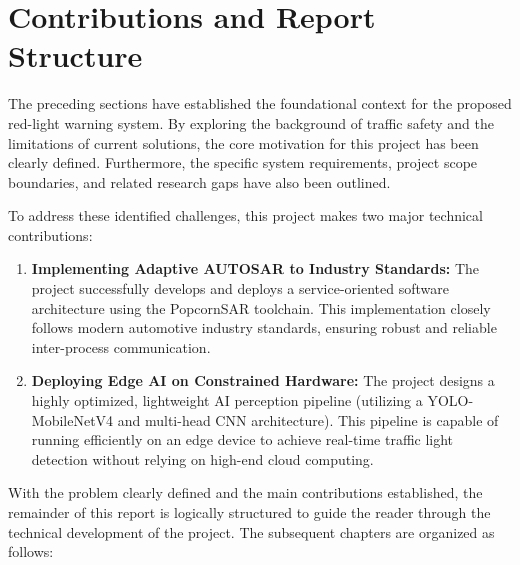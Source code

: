 \section{Contributions and Report Structure}

The preceding sections have established the foundational context for the proposed red-light warning system. By exploring the background of traffic safety and the limitations of current solutions, the core motivation for this project has been clearly defined. Furthermore, the specific system requirements, project scope boundaries, and related research gaps have also been outlined.

To address these identified challenges, this project makes two major technical contributions:
\begin{enumerate}
    \item \textbf{Implementing Adaptive AUTOSAR to Industry Standards:} The project successfully develops and deploys a service-oriented software architecture using the PopcornSAR toolchain. This implementation closely follows modern automotive industry standards, ensuring robust and reliable inter-process communication.
    \item \textbf{Deploying Edge AI on Constrained Hardware:} The project designs a highly optimized, lightweight AI perception pipeline (utilizing a YOLO-MobileNetV4 and multi-head CNN architecture). This pipeline is capable of running efficiently on an edge device to achieve real-time traffic light detection without relying on high-end cloud computing.
\end{enumerate}

With the problem clearly defined and the main contributions established, the remainder of this report is logically structured to guide the reader through the technical development of the project. The subsequent chapters are organized as follows:

